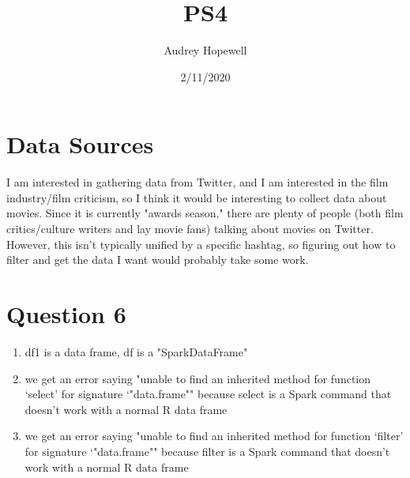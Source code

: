 \documentclass{article}
\title{PS4}
\author{Audrey Hopewell }
\date{2/11/2020}
\begin{document}
\maketitle

\section{Data Sources}
I am interested in gathering data from Twitter, and I am interested in the film industry/film criticism, so I think it would be interesting to collect data about movies. Since it is currently "awards season," there are plenty of people (both film critics/culture writers and lay movie fans) talking about movies on Twitter. However, this isn't typically unified by a specific hashtag, so figuring out how to filter and get the data I want would probably take some work. 


\section{Question 6}
\begin{enumerate}
    \item df1 is a data frame, df is a "SparkDataFrame"
    \item we get an error saying "unable to find an inherited method for function ‘select’ for signature ‘"data.frame"" because select is a Spark
    command that doesn't work with a normal R data frame
    \item we get an error saying "unable to find an inherited method for function ‘filter’ for signature ‘"data.frame"" because filter is a Spark
    command that doesn't work with a normal R data frame
\end{enumerate}
\end{document}
